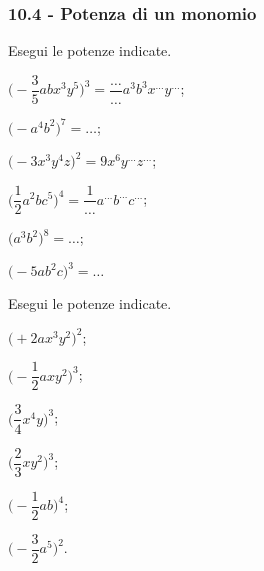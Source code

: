 \subsubsection*{10.4 - Potenza di un monomio}
\begin{esercizio}
 \label{ese:10.16} %
 Esegui le potenze indicate.
\begin{multicols}{2}
\begin{enumeratea}
\spazielenx
 \item $\bigg(-{\dfrac{3}{5}}abx^{3}y^{5}\bigg)^{3}=\dfrac{\ldots }{\ldots}a^{3}b^{3}x^{\ldots }y^{\ldots}$;
 \item $\big(-a^{4}b^{2}\big)^{7}=\ldots$;
 \item $\bigg(-3x^{3}y^{4}z\bigg)^{2}=9x^{6}y^{\ldots }z^{\ldots }$;
 \item $\bigg(\dfrac{1}{2}a^{2}bc^{5}\bigg)^{4}=\dfrac{1}{\ldots}a^{\ldots}b^{\ldots}c^{\ldots}$;
 \item $\big(a^{3}b^{2}\big)^{8}=\ldots$;
 \item $\big(-5ab^{2}c\big)^{3}=\ldots$
\end{enumeratea}
\end{multicols}
\end{esercizio}

\begin{esercizio}
 \label{ese:10.17} %
 Esegui le potenze indicate.
\begin{multicols}{3}
\begin{enumeratea}
\spazielenx
 \item $\big(+2ax^{3}y^{2}\big)^{2}$;
 \item $\bigg(-{\dfrac{1}{2}}axy^{2}\bigg)^{3}$;
 \item $\bigg(\dfrac{3}{4}x^{4}y\bigg)^{3}$;
 \item $\bigg(\dfrac{2}{3}xy^{2}\bigg)^{3}$;
 \item $\bigg(-{\dfrac{1}{2}}ab\bigg)^{4}$;
 \item $\bigg(-{\dfrac{3}{2}}a^{5}\bigg)^{2}$.
\end{enumeratea}
\end{multicols}
\end{esercizio}

